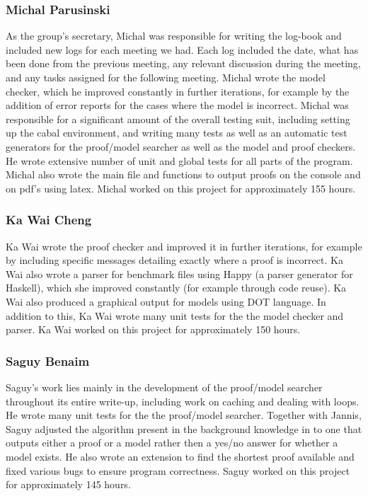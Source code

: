 \subsubsection*{Michal Parusinski}

As the group's secretary, Michal was responsible for writing the log-book and included new logs for each meeting we had. Each log included the date, what has been done from the previous meeting, any relevant discussion during the meeting, and any tasks assigned for the following meeting. Michal wrote the model checker, which he improved constantly in further iterations, for example by the addition of error reports for the cases where the model is incorrect. Michal was responsible for a significant amount of the overall testing suit, including setting up the cabal environment, and writing many tests as well as an automatic test generators for the proof/model searcher as well as the model and proof checkers. He wrote extensive number of unit and global tests for all parts of the program. Michal also wrote the main file and functions to output proofs on the console and on pdf's using latex. Michal worked on this project for approximately 155 hours.

\subsubsection*{Ka Wai Cheng}

Ka Wai wrote the proof checker and improved it in further iterations, for example by including specific messages detailing exactly where a proof is incorrect. Ka Wai also wrote a parser for benchmark files using Happy (a parser generator for Haskell), which she improved constantly (for example through code reuse). Ka Wai also produced a graphical output for models using DOT language. In addition to this, Ka Wai wrote many unit tests for the the model checker and parser.  Ka Wai worked on this project for approximately 150 hours. 

\subsubsection*{Saguy Benaim}

Saguy's work lies mainly in the development of the proof/model searcher throughout its entire write-up, including work on caching and dealing with loops. He wrote many unit tests for the the proof/model searcher. Together with Jannis, Saguy adjusted the algorithm present in the background knowledge in \cite{gore07} to one that outputs either a proof or a model rather then a yes/no answer for whether a model exists. He also wrote an extension to find the shortest proof available and fixed various bugs to ensure program correctness. Saguy worked on this project for approximately 145 hours. 
